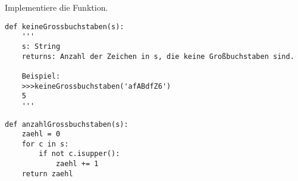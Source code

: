 \question[3] Implementiere die Funktion.
\begin{lstlisting}
def keineGrossbuchstaben(s):
    '''
    s: String
    returns: Anzahl der Zeichen in s, die keine Großbuchstaben sind.

    Beispiel:
    >>>keineGrossbuchstaben('afABdfZ6')
    5
    '''
\end{lstlisting}
\begin{solutionbox}{8cm}
\begin{lstlisting}
def anzahlGrossbuchstaben(s):
    zaehl = 0
    for c in s:
        if not c.isupper():
            zaehl += 1
    return zaehl
\end{lstlisting}
\end{solutionbox}
